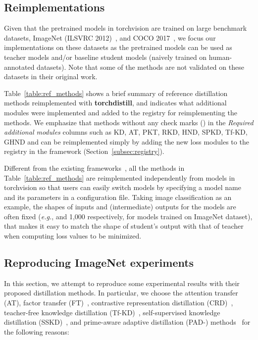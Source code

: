 \documentclass[runningheads]{llncs}
\newcommand{\FRAMEWORK}{{\bf torchdistill}\xspace}
\begin{document}
\subsection{Reimplementations}
\label{subsec:reimplementations}
Given that the pretrained models in torchvision are trained on large benchmark datasets, ImageNet (ILSVRC 2012)~\cite{russakovsky2015imagenet}, and COCO 2017~\cite{lin2014microsoft}, we focus our implementations on these datasets as the pretrained models can be used as teacher models and/or baseline student models (naively trained on human-annotated datasets).
Note that some of the methods are not validated on these datasets in their original work.

Table~\ref{table:ref_methods} shows a brief summary of reference distillation methods reimplemented with \FRAMEWORK, and indicates what additional modules were implemented and added to the registry for reimplementing the methods.
We emphasize that methods without any check marks (\checkmark) in the \emph{Required additional modules} columns such as KD, AT, PKT, RKD, HND, SPKD, Tf-KD, GHND and  can be reimplemented simply by adding the new loss modules to the registry in the framework (Section~\ref{subsec:registry}).

Different from the existing frameworks~\cite{zagoruyko2017paying,passalis2018learning,heo2019knowledge,park2019relational,tian2020contrastive,xu2020knowledge}, all the methods in Table~\ref{table:ref_methods} are reimplemented independently from models in torchvision so that users can easily switch models by specifying a model name and its parameters in a configuration file.
Taking image classification as an example, the shapes of inputs and (intermediate) outputs for the models are often fixed (\emph{e.g.},  and 1,000 respectively, for models trained on ImageNet dataset), that makes it easy to match the shape of student's output with that of teacher when computing loss values to be minimized.



\subsection{Reproducing ImageNet experiments}
\label{subsec:imagenet_experiments}
In this section, we attempt to reproduce some experimental results with their proposed distillation methods.
In particular, we choose the attention transfer (AT), factor transfer (FT)~\cite{kim2018paraphrasing}, contrastive representation distillation (CRD)~\cite{tian2020contrastive}, teacher-free knowledge distillation (Tf-KD)~\cite{yuan2020revisiting}, self-supervised knowledge distillation (SSKD)~\cite{xu2020knowledge},  and prime-aware adaptive distillation (PAD-) methods~\cite{zhang2020prime} for the following reasons:
\end{document}
